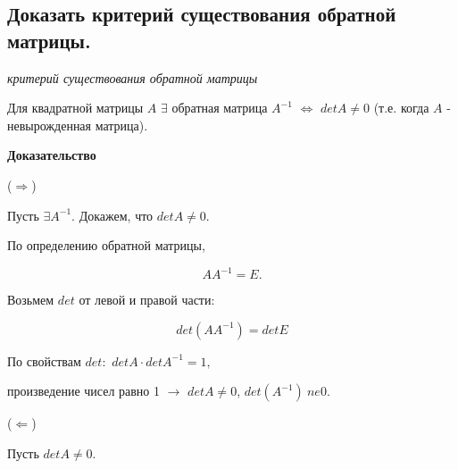 \ep

\subsection{Доказать критерий существования обратной матрицы.}

\textit{критерий существования обратной матрицы}

\vspace*{15pt}

Для квадратной матрицы $A$ $\exists$ обратная матрица $A^{-1}$ $\iff$ $detA \ne 0$ (т.е. когда $A$ - невырожденная матрица).

\vspace*{15pt}

{\bf {Доказательство}}

($\Rightarrow$)  

Пусть $\exists A^{-1}$. Докажем, что $detA \ne 0$.

По определению обратной матрицы, 

$$AA^{-1} = E.$$

Возьмем $det$ от левой и правой части:

$$det(AA^{-1}) = detE$$

По свойствам $det:$ $detA\cdot detA^{-1} = 1,$

произведение чисел равно 1 $\rightarrow$ $detA \ne 0$, $det(A^{-1}) \ ne 0$.

\vspace*{15pt}

($\Leftarrow$)

Пусть $detA \ne 0$.

